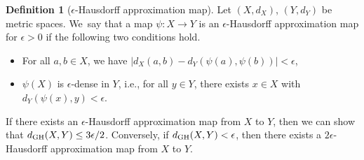 \documentclass[pdftex]{sigma}
\numberwithin{equation}{section}
\theoremstyle{definition}
\newtheorem{Def}[Thm]{Definition}
\begin{document}
\begin{Def}[$\epsilon$-Hausdorff approximation map]\label{hap}
Let $(X,d_X)$, $(Y,d_Y)$ be metric spaces.
We~say that a map $\psi\colon X\to Y$ is an $\epsilon$-Hausdorff approximation map for $\epsilon>0$ if the following two conditions hold.
\begin{itemize}\itemsep=0pt
\item[(i)] For all $a,b\in X$, we have $|d_X(a,b)-d_Y(\psi(a),\psi(b))|< \epsilon$,
\item[(ii)] $\psi(X)$ is $\epsilon$-dense in $Y$, i.e., for all $y\in Y$, there exists $x\in X$ with $d_Y(\psi(x),y)< \epsilon$.
\end{itemize}
\end{Def}
If there exists an $\epsilon$-Hausdorff approximation map from $X$ to $Y$, then we can show that $d_{{\rm GH}}(X,Y)\leq 3\epsilon/2$.
Conversely, if $d_{{\rm GH}}(X,Y)< \epsilon$, then there exists a $2\epsilon$-Hausdorff approximation map from $X$ to $Y$.
\end{document}
